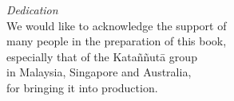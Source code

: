 
\cleartoverso

{\centering

\textit{Dedication}\\[0.4\baselineskip]
We would like to acknowledge the support of\\
many people in the preparation of this book,\\
especially that of the Kataññutā group\\
in Malaysia, Singapore and Australia,\\
for bringing it into production.

}

